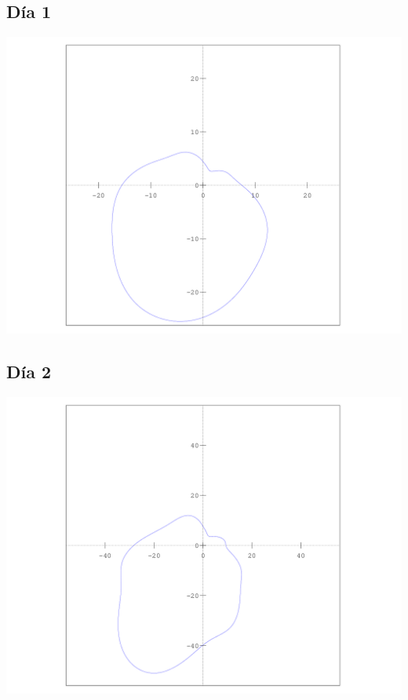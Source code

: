 \documentclass[12pt,spanish]{article}
\begin{document}
\subsection*{Día 1}
\includegraphics[scale=0.7]{../salida/dia1.png}
\subsection*{Día 2}
\includegraphics[scale=0.7]{../salida/dia2.png}
\end{document}
